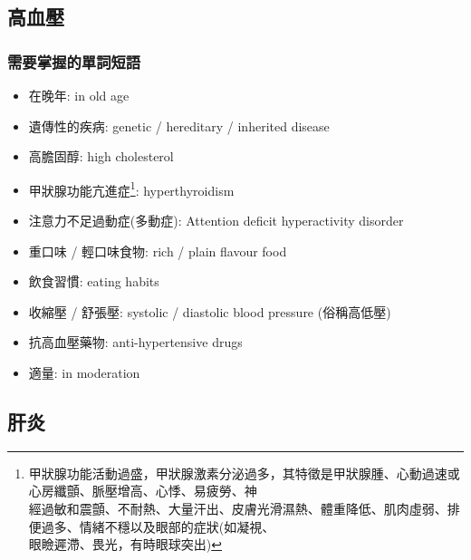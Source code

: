 \subsection{高血壓}
\subsubsection*{需要掌握的單詞短語}
\begin{itemize}
  \itemsep0em
  \item 在晚年: in old age
  \item 遺傳性的疾病: genetic / hereditary / inherited disease
  \item 高膽固醇: high cholesterol
  \item 甲狀腺功能亢進症\footnote{甲狀腺功能活動過盛，甲狀腺激素分泌過多，其特徵是甲狀腺腫、心動過速或心房纖顫、脈壓增高、心悸、易疲勞、神\\經過敏和震顫、不耐熱、大量汗出、皮膚光滑濕熱、體重降低、肌肉虛弱、排便過多、情緒不穩以及眼部的症狀(如凝視、\\眼瞼遲滯、畏光，有時眼球突出)}: hyperthyroidism 
  \item 注意力不足過動症(多動症): Attention deficit hyperactivity disorder
  \item 重口味 / 輕口味食物: rich / plain flavour food
  \item 飲食習慣: eating habits
  \item 收縮壓 / 舒張壓: systolic / diastolic blood pressure (俗稱高低壓)
  \item 抗高血壓藥物: anti-hypertensive drugs
  \item 適量: in moderation
\end{itemize}

\subsection{肝炎}
